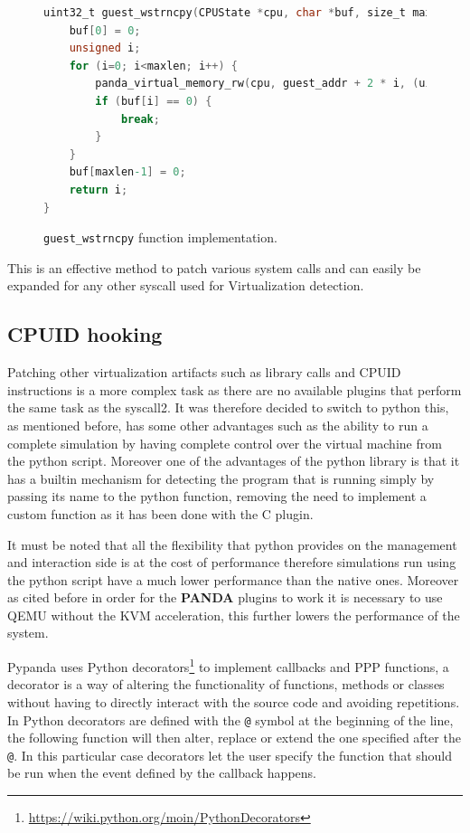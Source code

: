 \begin{figure}[htp]
\centering
\begin{lstlisting}[language=C] 
uint32_t guest_wstrncpy(CPUState *cpu, char *buf, size_t maxlen, target_ulong guest_addr) {
    buf[0] = 0;
    unsigned i;
    for (i=0; i<maxlen; i++) {
        panda_virtual_memory_rw(cpu, guest_addr + 2 * i, (uint8_t *)&buf[i], 1, 0);
        if (buf[i] == 0) {
            break;
        }
    }
    buf[maxlen-1] = 0;
    return i;
}
\end{lstlisting}
\caption{\lstinline{guest_wstrncpy} function implementation.}
\label{fig:gstrin}
\end{figure}

This is an effective method to patch various system calls and can easily be expanded for any other syscall used for Virtualization detection.


\subsection{CPUID hooking}
Patching other virtualization artifacts such as library calls and CPUID instructions is a more complex task as there are no available plugins that perform the same task as the syscall2. It was therefore decided to switch to python this, as mentioned before, has some other advantages such as the ability to run a complete simulation by having complete control over the virtual machine from the python script. Moreover one of the advantages of the python library is that it has a builtin mechanism for detecting the program that is running simply by passing its name to the python function, removing the need to implement a custom function as it has been done with the C plugin.

It must be noted that all the flexibility that python provides on the management and interaction side is at the cost of performance therefore simulations run using the python script have a much lower performance than the native ones. Moreover as cited before in order for the \textbf{PANDA} plugins to work it is necessary to use QEMU without the KVM acceleration, this further lowers the performance of the system. 

Pypanda uses Python decorators\footnote{\url{https://wiki.python.org/moin/PythonDecorators}} to implement callbacks and PPP functions, a decorator is a way of altering the functionality of functions, methods or classes without having to directly interact with the source code and avoiding repetitions. In Python decorators are defined with the \lstinline{@} symbol at the beginning of the line, the following function will then alter, replace or extend the one specified after the \lstinline{@}. In this particular case decorators let the user specify the function that should be run when the event defined by the callback happens. 

